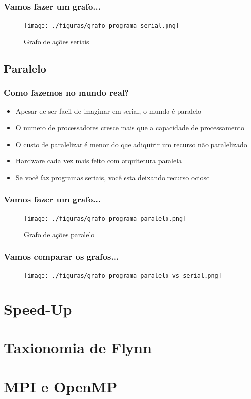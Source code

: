 \documentclass[10pt]{beamer}
\begin{document}
		\begin{frame}%
		\frametitle{Vamos fazer um grafo...}
			\begin{figure}
			\centering
				\texttt{[image: ./figuras/grafo\_programa\_serial.png]}
				\caption{Grafo de ações seriais}
			\end{figure}
		\end{frame}

	\subsection{Paralelo}
		\begin{frame}%
		\frametitle{Como fazemos no mundo real?}
			\begin{itemize}[<-+>]
				\item Apesar de ser facil de imaginar em serial, o mundo é paralelo
				\item O numero de processadores cresce mais que a capacidade de processamento
				\item O custo de paralelizar é menor do que adiquirir um recurso não paralelizado
				\item Hardware cada vez mais feito com arquitetura paralela
				\item Se você faz programas seriais, você esta deixando recurso ocioso
			\end{itemize}
		\end{frame}

		\begin{frame}%
		\frametitle{Vamos fazer um grafo...}
			\begin{figure}
			\centering
				\texttt{[image: ./figuras/grafo\_programa\_paralelo.png]}
				\caption{Grafo de ações paralelo}
			\end{figure}
		\end{frame}

		\begin{frame}%
		\frametitle{Vamos comparar os grafos...}
			\begin{figure}
			\centering
				\texttt{[image: ./figuras/grafo\_programa\_paralelo\_vs\_serial.png]}
			\end{figure}
		\end{frame}

\section{Speed-Up}
\section{Taxionomia de Flynn}
\section{MPI e OpenMP}
\end{document}
